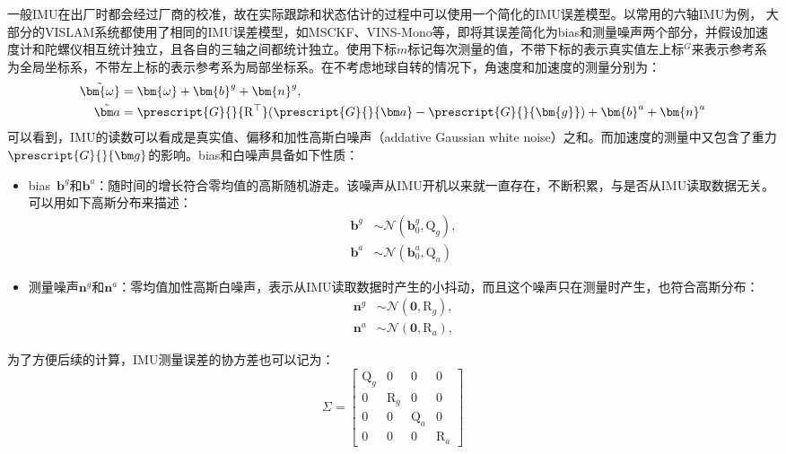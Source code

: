 一般IMU在出厂时都会经过厂商的校准，故在实际跟踪和状态估计的过程中可以使用一个简化的IMU误差模型。以常用的六轴IMU为例，
大部分的VISLAM系统都使用了相同的IMU误差模型，如MSCKF、VINS-Mono等，即将其误差简化为bias和测量噪声两个部分，并假设加速度计和陀螺仪相互统计独立，且各自的三轴之间都统计独立。使用下标$m$标记每次测量的值，不带下标的表示真实值左上标$^G$来表示参考系为全局坐标系，不带左上标的表示参考系为局部坐标系。在不考虑地球自转的情况下，角速度和加速度的测量分别为：
\begin{equation}
\begin{aligned}
    \tilde{\bm{\omega}}
        &= \bm{\omega} + \bm{b}^g + \bm{n}^g,  \\
    \tilde{\bm a}
        &= \prescript{G}{}{\mathrm{R}^\top}
            (\prescript{G}{}{\bm a} - \prescript{G}{}{\bm{g}}) +
                \bm{b}^a + \bm{n}^a
\end{aligned}
\end{equation}
可以看到，IMU的读数可以看成是真实值、偏移和加性高斯白噪声（addative Gaussian white noise）之和。而加速度的测量中又包含了重力$\prescript{G}{}{\bm g}$的影响。bias和白噪声具备如下性质：
\begin{itemize}
    \item bias~$\bm{b}^g$和$\bm{b}^a$：随时间的增长符合零均值的高斯随机游走。该噪声从IMU开机以来就一直存在，不断积累，与是否从IMU读取数据无关。可以用如下高斯分布来描述：
        \begin{equation}
        \begin{aligned}
            \bm{b}^g &\sim \mathcal{N}(\bm{b}_0^g, \mathrm{Q}_g), \\
            \bm{b}^a &\sim \mathcal{N}(\bm{b}_0^a, \mathrm{Q}_a)
        \end{aligned}
        \end{equation}
    \item 测量噪声$\bm{n}^g$和$\bm{n}^a$：零均值加性高斯白噪声，表示从IMU读取数据时产生的小抖动，而且这个噪声只在测量时产生，也符合高斯分布：
        \begin{equation}
        \begin{aligned}
            \bm{n}^g & \sim \mathcal{N}(\bm{0}, \mathrm{R}_g), \\
            \bm{n}^a & \sim \mathcal{N}(\bm{0}, \mathrm{R}_a),
        \end{aligned}
        \end{equation}
\end{itemize}
为了方便后续的计算，IMU测量误差的协方差也可以记为：
\begin{equation}
\Sigma =
    \begin{bmatrix}
        \mathrm{Q}_g &            0 &            0 &         0 \\
                   0 & \mathrm{R}_g &            0 &         0 \\
                   0 &            0 & \mathrm{Q}_a &         0 \\
                   0 &            0 &            0 & \mathrm{R}_a
    \end{bmatrix}
\end{equation}

